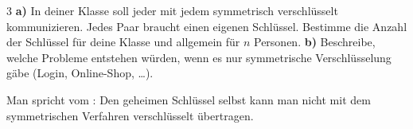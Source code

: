 \documentclass[11pt,a4paper]{article}
\begin{document}
\begin{aufgabe}{3}
\textbf{a)} In deiner Klasse soll jeder mit jedem symmetrisch verschlüsselt kommunizieren. Jedes Paar braucht einen eigenen Schlüssel. Bestimme die Anzahl der Schlüssel für deine Klasse und allgemein für $n$ Personen.
\textbf{b)} Beschreibe, welche Probleme entstehen würden, wenn es nur symmetrische Verschlüsselung gäbe (Login, Online-Shop, \ldots).
{\lueckentext Man spricht vom : Den geheimen Schlüssel selbst kann man nicht mit dem symmetrischen Verfahren verschlüsselt übertragen.\par}
\end{aufgabe}
\end{document}

